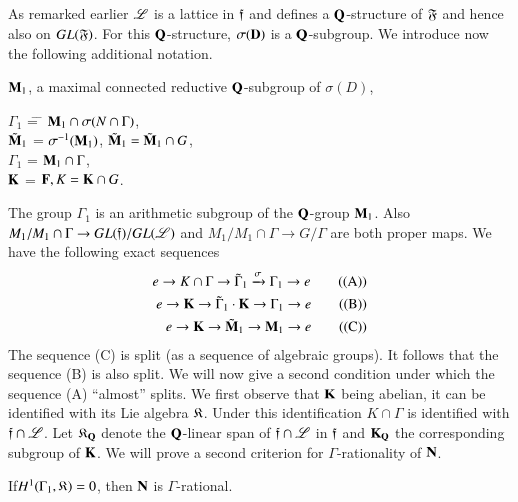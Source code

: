 \setcounter{subsection}{5}
\subsection{}\label{art9-subsec5.6}
As remarked earlier $\mathscr{L}$ is a lattice in $\mathfrak{f}$ and defines a $\mathbf{Q}$-structure of $\mathfrak{F}$ and hence also on $GL (\mathfrak{F})$.  For this $\mathbf{Q}$-structure, $\sigma (\mathbf{D})$ is a $\mathbf{Q}$-subgroup. We introduce now the following additional notation.

$\mathbf{M}_1$, a maximal connected reductive $\mathbf{Q}$-subgroup of $\sigma (D)$,
\begin{tabbing}
$\Gamma_1$ \= = \= $\mathbf{M}_1 \cap \sigma (N\cap \Gamma)$,\\[0.1cm]
$\tilde{\mathbf{M}}_1$ \> = \> $\sigma^{-1} (\mathbf{M}_1)$, $\tilde{\mathbf{M}}_1 = \tilde{\mathbf{M}}_1 \cap G$,\\[0.1cm]
$\Gamma_1$ \> = \> $\mathbf{M}_1 \cap \Gamma$,\\[0.1cm]
$\mathbf{K}$ \> = \>  $\mathbf{F}, K = \mathbf{K} \cap G$.
\end{tabbing}
The group $\Gamma_1$ is an arithmetic subgroup of the $\mathbf{Q}$-group $\mathbf{M}_1$. Also $M_1 / M_1 \cap \Gamma  \to GL (\mathfrak{f})/ GL (\mathscr{L})$ and $M_1/ M_1 \cap \Gamma \to G / \Gamma$ are both proper maps. We have the following exact sequences 
\begin{align*}
e \to K \cap \Gamma \to \tilde{\Gamma}_1 \xrightarrow{\sigma} \Gamma_1 \to e \tag{(A)}\\
e \to \mathbf{K} \to \tilde{\Gamma}_1 \cdot \mathbf{K} \to \Gamma_1 \to e \tag{(B)}\\
e \to \mathbf{K} \to \tilde{\mathbf{M}}_1 \to \mathbf{M}_1 \to e \tag{(C)}
\end{align*}
The sequence (C) is split (as a sequence of algebraic groups). It follows that the sequence (B) is also split. We will now give a second condition under which the sequence (A) ``almost'' splits. We first observe that $\mathbf{K}$ being abelian, it can be identified with its Lie algebra $\mathfrak{K}$. Under this identification $K \cap \Gamma$ is identified with $\mathfrak{f} \cap \mathscr{L}$. Let $\mathfrak{K}_{\mathbf{Q}}$ denote the $\mathbf{Q}$-linear span of $\mathfrak{f} \cap \mathscr{L}$ in $\mathfrak{f}$ and $\mathbf{K}_{\mathbf{Q}}$ the corresponding subgroup of $\mathbf{K}$. We will prove a second criterion for $\Gamma$-rationality of $\mathbf{N}$.

\setcounter{definition}{6}
\begin{proposition}\label{art9-prop5.7}
If\pageoriginale $H^1 (\Gamma_1, \mathfrak{K})=0$, then $\mathbf{N}$ is $\Gamma$-rational.
\end{proposition}

\setcounter{subsection}{7}
